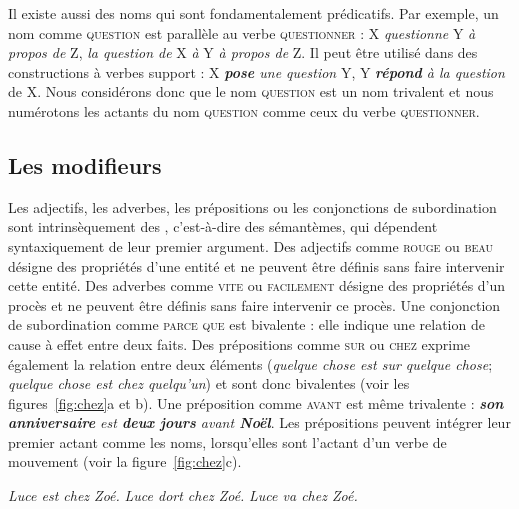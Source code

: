 Il existe aussi des noms qui sont fondamentalement prédicatifs. Par exemple, un nom comme \textsc{question} est parallèle au verbe \textsc{questionner} : X \textit{questionne} Y \textit{à propos de} Z, \textit{la question de} X \textit{à} Y \textit{à propos de} Z. Il peut être utilisé dans des constructions à verbes support : X \textit{\textbf{pose} une question} Y, Y \textit{\textbf{répond} à la question} de X. Nous considérons donc que le nom \textsc{question} est un nom trivalent et nous numérotons les actants du nom \textsc{question} comme ceux du verbe \textsc{questionner}.

\subsection{Les modifieurs}\largerpage
Les adjectifs, les adverbes, les prépositions ou les conjonctions de subordination sont intrinsèquement des , c’est-à-dire des sémantèmes, qui dépendent syntaxiquement de leur premier argument. Des adjectifs comme \textsc{rouge} ou \textsc{beau} désigne des propriétés d’une entité et ne peuvent être définis sans faire intervenir cette entité. Des adverbes comme \textsc{vite} ou \textsc{facilement} désigne des propriétés d’un procès et ne peuvent être définis sans faire intervenir ce procès. Une conjonction de subordination comme \textsc{parce que} est bivalente : elle indique une relation de cause à effet entre deux faits. Des prépositions comme \textsc{sur} ou \textsc{chez} exprime également la relation entre deux éléments (\textit{quelque chose est sur quelque chose}; \textit{quelque chose est chez quelqu’un}) et sont donc bivalentes (voir les figures~\ref{fig:chez}a et b). Une préposition comme \textsc{avant} est même trivalente : \textit{\textbf{son anniversaire} est \textbf{deux jours} avant \textbf{Noël}}. Les prépositions peuvent intégrer leur premier actant comme les noms, lorsqu’elles sont l’actant d’un verbe de mouvement (voir la figure~\ref{fig:chez}c).

\ea\label{ex:chez} 
\ea \textit{Luce est chez Zoé.}
\ex \textit{Luce dort chez Zoé.}
\ex \textit{Luce va chez Zoé.}\z\z

